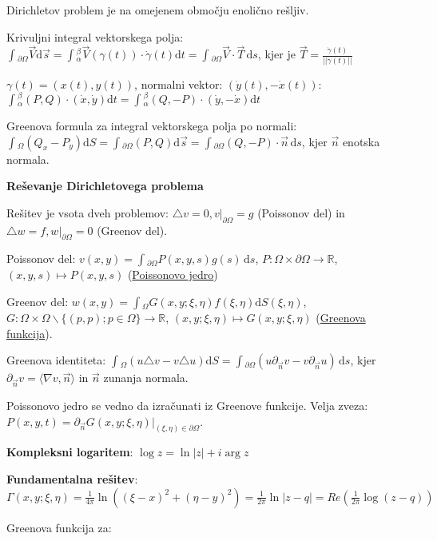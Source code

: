 \documentclass[10pt,a4paper]{amsart}
\theoremstyle{definition} %
\theoremstyle{plain} %
\newcommand{\ds}{\ensuremath{\,\mathrm{d}s}}
\let\oldint\int
\renewcommand{\int}{\oldint \!}
\newcommand{\R}{\mathbb R}
\begin{document}
Dirichletov problem je na omejenem območju enolično rešljiv.

Krivuljni integral vektorskega polja: $\int_{\partial \Omega}\vec{V} \mathrm{d}\vec{s} = \int_\alpha^\beta \vec{V}(\gamma (t))\cdot \dot{\gamma} (t)  \mathrm{d}t = \int_{\partial \Omega} \vec{V} \cdot \vec{T} \ds$, kjer je $\vec{T} = \frac{\dot{\gamma}(t)}{||\dot{\gamma}(t)||}$

$\gamma (t) = (x(t),y(t))$, normalni vektor: $(\dot{y}(t), -\dot{x}(t))$: $\int_\alpha^\beta (P,Q)\cdot (\dot{x},\dot{y}) \mathrm{d}t = \int_\alpha^\beta (Q,-P)\cdot (\dot{y},-\dot{x}) \mathrm{d}t $

Greenova formula za integral vektorskega polja po normali: $\int_\Omega (Q_x - P_y)  \mathrm{d} S = \int_{\partial \Omega} (P,Q)  \mathrm{d}\vec{s} = \int_{\partial \Omega} (Q,-P) \cdot \vec{n} \ds$, kjer $\vec{n}$ enotska normala.

\textbf{Reševanje Dirichletovega problema}

Rešitev je vsota dveh problemov: $\triangle v = 0, v|_{\partial \Omega} = g$ (Poissonov del) in $\triangle w = f, w|_{\partial \Omega} = 0$ (Greenov del).

Poissonov del: $v(x,y) = \int_{\partial \Omega} P(x,y,s)g(s)\ds$, $P:\Omega \times \partial \Omega \rightarrow \R$, $(x,y,s) \mapsto P(x,y,s)$ (\underline{Poissonovo jedro})

Greenov del: $w(x,y) = \int_\Omega G(x,y;\xi,\eta ) f(\xi , \eta )  \mathrm{d}S(\xi,\eta)$, $G: \Omega \times \Omega \backslash \{ (p,p); p\in \Omega \}  \rightarrow \R$, $(x,y;\xi,\eta) \mapsto G(x,y; \xi, \eta)$ (\underline{Greenova funkcija}).

Greenova identiteta: $\int_\Omega (u \triangle v - v \triangle u)  \mathrm{d}S = \int_{\partial \Omega} (u \partial_{\vec{n}}v - v \partial_{\vec{n}} u) \ds$, kjer $\partial_{\vec{n}} v = \langle \nabla v , \vec{n} \rangle$ in $\vec{n}$ zunanja normala.

Poissonovo jedro se vedno da izračunati iz Greenove funkcije. Velja zveza: $ P(x,y,t) = \partial_{\vec{n}} G (x,y;\xi , \eta ) |_{(\xi ,\eta ) \in \partial \Omega}$.

\textbf{Kompleksni logaritem}: $\log z = \ln |z| + i \arg z$

\textbf{Fundamentalna rešitev}: $\Gamma (x,y;\xi,\eta) = \frac{1}{4\pi} \ln ((\xi - x)^2 + (\eta - y)^2)=\frac{1}{2\pi} \ln |z-q| = Re ( \frac{1}{2\pi} \log (z-q) )$

Greenova funkcija za:
\end{document}
